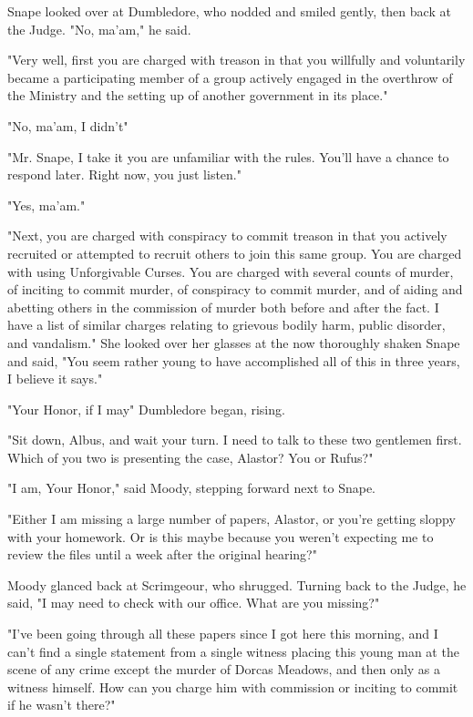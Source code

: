 Snape looked over at Dumbledore, who nodded and smiled gently, then back at the Judge. "No, ma'am," he said.

"Very well, first you are charged with treason in that you willfully and voluntarily became a participating member of a group actively engaged in the overthrow of the Ministry and the setting up of another government in its place."

"No, ma'am, I didn't{\el}"

"Mr. Snape, I take it you are unfamiliar with the rules. You'll have a chance to respond later. Right now, you just listen."

"Yes, ma'am."

"Next, you are charged with conspiracy to commit treason in that you actively recruited or attempted to recruit others to join this same group. You are charged with using Unforgivable Curses. You are charged with several counts of murder, of inciting to commit murder, of conspiracy to commit murder, and of aiding and abetting others in the commission of murder both before and after the fact. I have a list of similar charges relating to grievous bodily harm, public disorder, and vandalism." She looked over her glasses at the now thoroughly shaken Snape and said, "You seem rather young to have accomplished all of this in{\el} three years, I believe it says."

"Your Honor, if I may{\el}" Dumbledore began, rising.

"Sit down, Albus, and wait your turn. I need to talk to these two gentlemen first. Which of you two is presenting the case, Alastor? You or Rufus?"

"I am, Your Honor," said Moody, stepping forward next to Snape.

"Either I am missing a large number of papers, Alastor, or you're getting sloppy with your homework. Or is this maybe because you weren't expecting me to review the files until a week after the original hearing?"

Moody glanced back at Scrimgeour, who shrugged. Turning back to the Judge, he said, "I may need to check with our office. What are you missing?"

"I've been going through all these papers since I got here this morning, and I can't find a single statement from a single witness placing this young man at the scene of any crime except the murder of Dorcas Meadows, and then only as a witness himself. How can you charge him with commission or inciting to commit if he wasn't there?"


